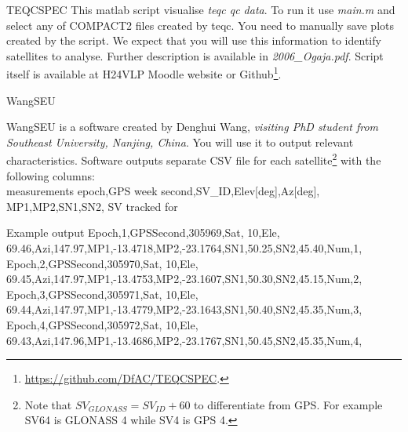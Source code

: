 \documentclass[11pt]{beamer}
\newcommand{\MatlabRef}{\footnote{\url{https://github.com/DfAC/TEQCSPEC}.}}
\begin{document}
	\begin{frame}{TEQCSPEC}
		This matlab script visualise \textit{teqc qc data}. To run it use \textit{main.m} and select any of COMPACT2 files created by teqc. You need to manually save plots created by the script. We expect that you will use this information to identify satellites to analyse.
		\medskip
		Further description is available in \textit{2006\_Ogaja.pdf}. Script itself is available at H24VLP Moodle website or Github\MatlabRef.
	\end{frame}	

	\begin{frame}[allowframebreaks]{WangSEU}

	WangSEU is a software created by Denghui Wang, \textit{visiting PhD student from Southeast University, Nanjing, China}. You will use it to output relevant characteristics. Software outputs separate CSV file for each satellite\footnote{Note that $SV_{GLONASS} =  SV_{ID} + 60$ to differentiate from GPS. For example SV64 is GLONASS 4 while SV4 is GPS 4.} with the following columns:\\
\tiny{measurements epoch,GPS week second,SV\_ID,Elev[deg],Az[deg], MP1,MP2,SN1,SN2, SV tracked for}\\
\medskip
	\begin{exampleblock}{Example output}{
\tiny{
Epoch,1,GPSSecond,305969,Sat, 10,Ele, 69.46,Azi,147.97,MP1,-13.4718,MP2,-23.1764,SN1,50.25,SN2,45.40,Num,1,\\
Epoch,2,GPSSecond,305970,Sat, 10,Ele, 69.45,Azi,147.97,MP1,-13.4753,MP2,-23.1607,SN1,50.30,SN2,45.15,Num,2,\\
Epoch,3,GPSSecond,305971,Sat, 10,Ele, 69.44,Azi,147.97,MP1,-13.4779,MP2,-23.1643,SN1,50.40,SN2,45.35,Num,3,\\
Epoch,4,GPSSecond,305972,Sat, 10,Ele, 69.43,Azi,147.96,MP1,-13.4686,MP2,-23.1767,SN1,50.45,SN2,45.35,Num,4,\\
}
		}
	\end{exampleblock}



	\end{frame}
\end{document}
